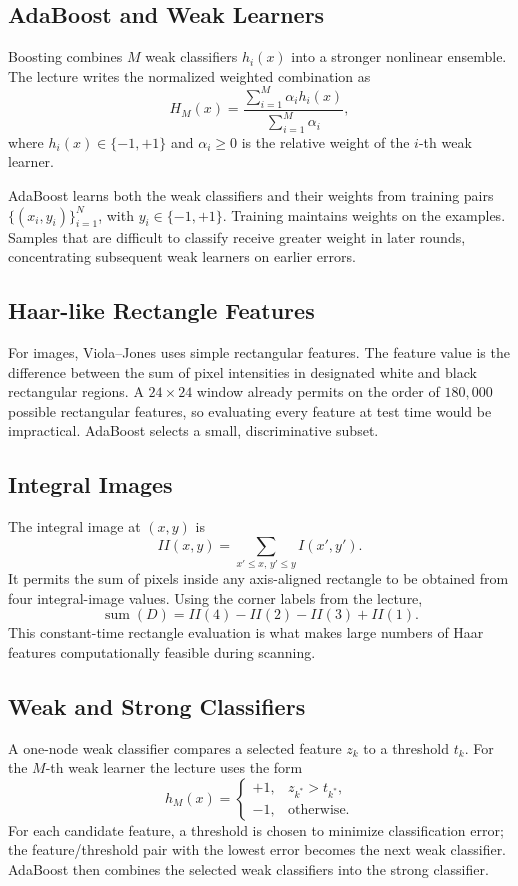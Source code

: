 \documentclass[11pt,a4paper,oneside]{report}
\begin{document}
\subsection{AdaBoost and Weak Learners}

Boosting combines $M$ weak classifiers $h_i(x)$ into a stronger nonlinear
ensemble.  The lecture writes the normalized weighted combination as
\[
    H_M(x)=
    \frac{\sum_{i=1}^{M}\alpha_i h_i(x)}
         {\sum_{i=1}^{M}\alpha_i},
\]
where $h_i(x)\in\{-1,+1\}$ and $\alpha_i\ge 0$ is the relative weight of the
$i$-th weak learner.

AdaBoost learns both the weak classifiers and their weights from training pairs
$\{(x_i,y_i)\}_{i=1}^{N}$, with $y_i\in\{-1,+1\}$.  Training maintains weights
on the examples.  Samples that are difficult to classify receive greater weight
in later rounds, concentrating subsequent weak learners on earlier errors.

\subsection{Haar-like Rectangle Features}

For images, Viola--Jones uses simple rectangular features.  The feature value is
the difference between the sum of pixel intensities in designated white and
black rectangular regions.  A $24\times24$ window already permits on the order
of $180{,}000$ possible rectangular features, so evaluating every feature at
test time would be impractical.  AdaBoost selects a small, discriminative subset.

\subsection{Integral Images}

The integral image at $(x,y)$ is
\[
    II(x,y)=\sum_{x'\le x,\,y'\le y}I(x',y').
\]
It permits the sum of pixels inside any axis-aligned rectangle to be obtained
from four integral-image values.  Using the corner labels from the lecture,
\[
    \operatorname{sum}(D)=II(4)-II(2)-II(3)+II(1).
\]
This constant-time rectangle evaluation is what makes large numbers of Haar
features computationally feasible during scanning.

\subsection{Weak and Strong Classifiers}

A one-node weak classifier compares a selected feature $z_k$ to a threshold
$t_k$.  For the $M$-th weak learner the lecture uses the form
\[
h_M(x)=
\begin{cases}
+1,&z_{k^{\ast}}>t_{k^{\ast}},\\
-1,&\text{otherwise}.
\end{cases}
\]
For each candidate feature, a threshold is chosen to minimize classification
error; the feature/threshold pair with the lowest error becomes the next weak
classifier.  AdaBoost then combines the selected weak classifiers into the
strong classifier.
\end{document}
